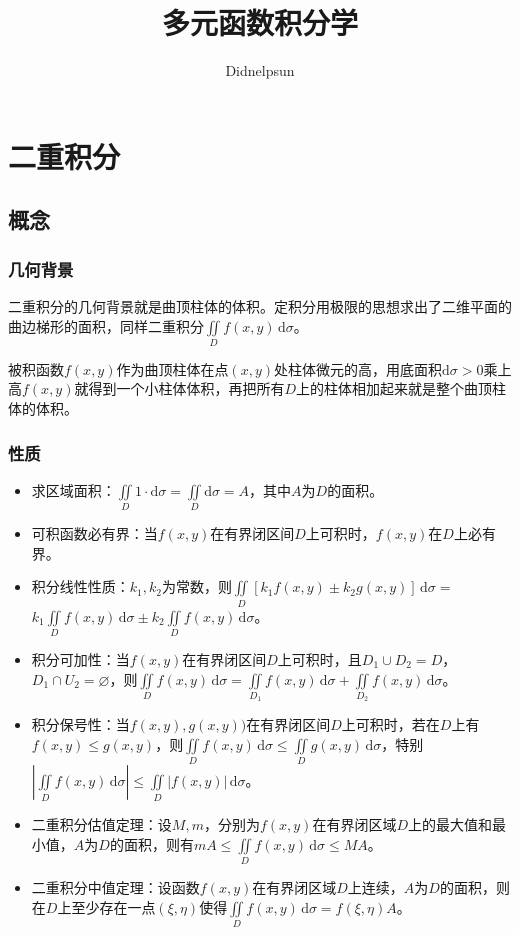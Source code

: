 \documentclass[UTF8, 12pt]{ctexart}
\author{Didnelpsun}
\title{多元函数积分学}
\date{}
\begin{document}
\maketitle
\pagestyle{empty}
\thispagestyle{empty}
\tableofcontents
\thispagestyle{empty}
\newpage
\pagestyle{plain}
\setcounter{page}{1}
\section{二重积分}

\subsection{概念}

\subsubsection{几何背景}

二重积分的几何背景就是曲顶柱体的体积。定积分用极限的思想求出了二维平面的曲边梯形的面积，同样二重积分$\iint\limits_Df(x,y)\,\textrm{d}\sigma$。

被积函数$f(x,y)$作为曲顶柱体在点$(x,y)$处柱体微元的高，用底面积$\textrm{d}\sigma>0$乘上高$f(x,y)$就得到一个小柱体体积，再把所有$D$上的柱体相加起来就是整个曲顶柱体的体积。

\subsubsection{性质}

\begin{itemize}
    \item 求区域面积：$\iint\limits_D1\cdot\textrm{d}\sigma=\iint\limits_D\textrm{d}\sigma=A$，其中$A$为$D$的面积。
    \item 可积函数必有界：当$f(x,y)$在有界闭区间$D$上可积时，$f(x,y)$在$D$上必有界。
    \item 积分线性性质：$k_1,k_2$为常数，则$\iint\limits_D[k_1f(x,y)\pm k_2g(x,y)]\,\textrm{d}\sigma=$\\$k_1\iint\limits_Df(x,y)\,\textrm{d}\sigma\pm k_2\iint\limits_Df(x,y)\,\textrm{d}\sigma$。
    \item 积分可加性：当$f(x,y)$在有界闭区间$D$上可积时，且$D_1\cup D_2=D$，$D_1\cap U_2=\varnothing$，则$\iint\limits_Df(x,y)\,\textrm{d}\sigma=\iint\limits_{D_1}f(x,y)\,\textrm{d}\sigma+\iint\limits_{D_2}f(x,y)\,\textrm{d}\sigma$。
    \item 积分保号性：当$f(x,y),g(x,y))$在有界闭区间$D$上可积时，若在$D$上有$f(x,y)\leqslant g(x,y)$，则$\iint\limits_Df(x,y)\,\textrm{d}\sigma\leqslant\iint\limits_Dg(x,y)\,\textrm{d}\sigma$，特别$\left\vert\iint\limits_Df(x,y)\,\textrm{d}\sigma\right\vert\leqslant\iint\limits_D\vert f(x,y)\vert\,\textrm{d}\sigma$。
    \item 二重积分估值定理：设$M,m$，分别为$f(x,y)$在有界闭区域$D$上的最大值和最小值，$A$为$D$的面积，则有$mA\leqslant\iint\limits_Df(x,y)\,\textrm{d}\sigma\leqslant MA$。
    \item 二重积分中值定理：设函数$f(x,y)$在有界闭区域$D$上连续，$A$为$D$的面积，则在$D$上至少存在一点$(\xi,\eta)$使得$\iint\limits_Df(x,y)\,\textrm{d}\sigma=f(\xi,\eta)A$。
\end{itemize}
\end{document}
